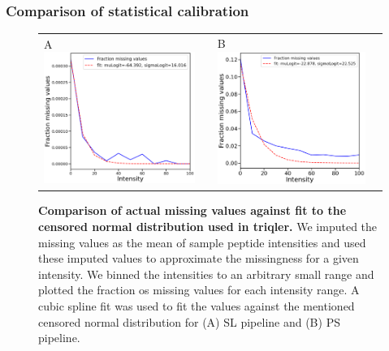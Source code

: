 \documentclass[11pt]{article}
\begin{document}
\subsubsection*{Comparison of statistical calibration}
\begin{figure}[hbt]
    \centering
    \centering
    \begin{tabular}{lclc} 
        A \includegraphics[width=0.5\linewidth]{../../result/report_plots/osw_fraction_missing_values.png} & &%
        B \includegraphics[width=0.5\linewidth]{../../result/report_plots/diann_fraction_missing_values.png} & \\%
    \end{tabular}
    \caption{{\bf Comparison of actual missing values against fit to the censored normal distribution used in triqler.} We imputed the missing values as the mean of sample peptide intensities and used these imputed values to approximate the missingness for a given intensity. We binned the intensities to an arbitrary small range and plotted the fraction os missing values for each intensity range. A cubic spline fit was used to fit the values against the mentioned censored normal distribution for (A) SL pipeline  and (B) PS pipeline. \label{fig:fraction_missing_values}}

\end{figure}
\end{document}
